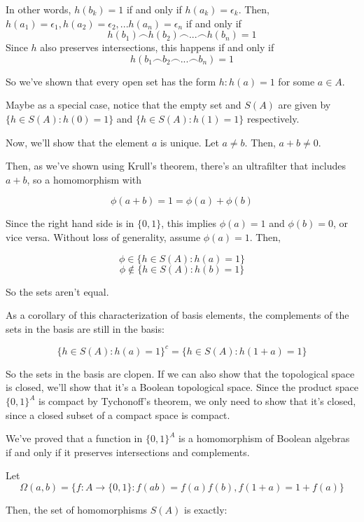 \documentclass{article}
\begin{document}
      In other words, $h(b_k) = 1$ if and only if $h(a_k) = \epsilon_k$. Then,
      $h(a_1) = \epsilon_1, h(a_2) = \epsilon_2, ... h(a_n) = \epsilon_n$
      if and only if
      \[h(b_1) \frown h(b_2) \frown ... \frown h(b_n) = 1\]
      Since $h$ also preserves intersections, this happens if and only if
      \[h(b_1 \frown b_2 \frown ... \frown b_n) = 1\]

      So we've shown that every open set has the form ${h : h(a) = 1}$ for some
      $a \in A$.

      Maybe as a special case, notice that the empty set and $S(A)$ are given
      by $\{h \in S(A) : h(0) = 1\}$ and $\{h \in S(A) : h(1) = 1\}$
      respectively.

      Now, we'll show that the element $a$ is unique. Let $a \neq b$. Then, $a+b
      \neq 0$.

      Then, as we've shown using Krull's theorem, there's an ultrafilter that
      includes $a+b$, so a homomorphism with

      \[\phi(a+b) = 1 = \phi(a) + \phi(b)\]

      Since the right hand side is in $\{0,1\}$, this implies $\phi(a) = 1$ and
      $\phi(b) = 0$, or vice versa. Without loss of generality, assume $\phi(a)
      = 1$. Then,

      \[\phi \in \{h \in S(A): h(a) = 1\}\]
      \[\phi \notin \{h \in S(A) : h(b) = 1\}\]

      So the sets aren't equal.

      As a corollary of this characterization of basis elements, the complements
      of the sets in the basis are still in the basis:

      \[\{h \in S(A) : h(a) = 1\}^c = \{h \in S(A) : h(1+a) = 1\}\]

      So the sets in the basis are clopen. If we can also show that the
      topological space is closed, we'll show that it's a Boolean topological
      space. Since the product space $\{0,1\}^A$ is compact by Tychonoff's
      theorem, we only need to show that it's closed, since a closed subset of a
      compact space is compact.

      We've proved that a function in $\{0,1\}^A$ is a homomorphism of Boolean
      algebras if and only if it
      preserves intersections and complements.

      Let
      \[\Omega(a,b) = \{ f: A \rightarrow \{0,1\} : f(ab) = f(a)f(b), f(1+a) = 1
      + f(a)\}\]

      Then, the set of homomorphisms $S(A)$ is exactly:
\end{document}
